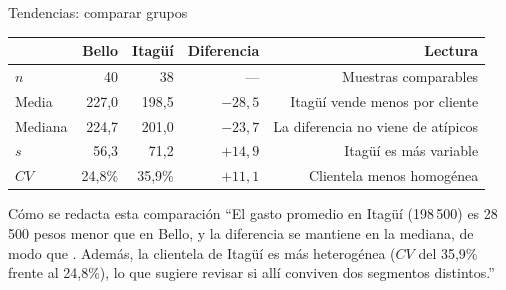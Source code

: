 \documentclass[aspectratio=169,10pt]{beamer}
\begin{document}
\begin{frame}{Tendencias: comparar grupos}
  \scriptsize
  \begin{center}
  \begin{tabular}{@{}lrrrr@{}}
    \toprule
    & \textbf{Bello} & \textbf{Itagüí} & \textbf{Diferencia} &
    \textbf{Lectura} \\
    \midrule
    $n$ & 40 & 38 & --- & Muestras comparables \\
    Media & 227{,}0 & 198{,}5 & $-28{,}5$ & Itagüí vende menos por cliente \\
    Mediana & 224{,}7 & 201{,}0 & $-23{,}7$ & La diferencia no viene de atípicos \\
    $s$ & 56{,}3 & 71{,}2 & $+14{,}9$ & Itagüí es más variable \\
    $CV$ & 24{,}8\% & 35{,}9\% & $+11{,}1$ & Clientela menos homogénea \\
    \bottomrule
  \end{tabular}
  \end{center}

  \vspace{0.1cm}
  \begin{alertblock}{Cómo se redacta esta comparación}
    \scriptsize
    ``El gasto promedio en Itagüí (198\,500) es 28\,500 pesos menor que en
    Bello, y la diferencia se mantiene en la mediana, de modo que
    . Además, la
    clientela de Itagüí es más heterogénea ($CV$ del 35,9\% frente al
    24,8\%), lo que sugiere revisar si allí conviven dos segmentos
    distintos.''
  \end{alertblock}
\end{frame}
\end{document}
